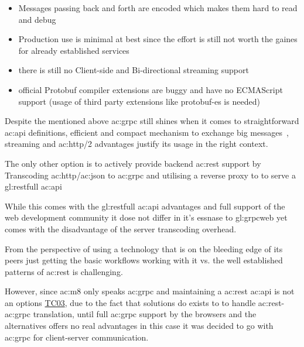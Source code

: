 \begin{itemize}
  \item Messages passing back and forth are encoded which makes them hard to read and debug
  \item Production use is minimal at best since the effort is still not worth the gaines for already established services
  \item there is still no Client-side and Bi-directional streaming support
  \item official Protobuf compiler extensions are buggy and have no ECMAScript support (usage of third party extensions like protobuf-es is needed)
\end{itemize}

Despite the mentioned above \gls{ac:grpc} still shines when it comes to straightforward \gls{ac:api} definitions, efficient and compact mechanism to exchange big messages~\citep{richardson2018microservices}, streaming and \gls{ac:http}/2 advantages justify its usage in the right context. 


The only other option is to actively provide backend \gls{ac:rest} support by Transcoding \gls{ac:http}/\gls{ac:json} to \gls{ac:grpc} and utilising a reverse proxy to to serve a \gls{gl:restfull} \gls{ac:api}~\citep{grpcgateway}


While this comes with the \gls{gl:restfull} \gls{ac:api} advantages and full support of the web development community it dose not differ in it's essnase to \gls{gl:grpcweb} yet comes with the disadvantage of the server transcoding overhead.


From the perspective of using a technology that is on the bleeding edge of its peers just getting the basic workflows working with it vs. the well established patterns of \gls{ac:rest} is challenging.

However, since \gls{ac:m8} only speaks \gls{ac:grpc} and maintaining a \gls{ac:rest} \gls{ac:api} is not an options \hyperref[tab:actc]{TC03}, due to the fact that solutions do exists to to handle \gls{ac:rest}-\gls{ac:grpc} translation, until full \gls{ac:grpc} support by the browsers and the alternatives offers no real advantages in this case it was decided to go with \gls{ac:grpc} for client-server communication.


